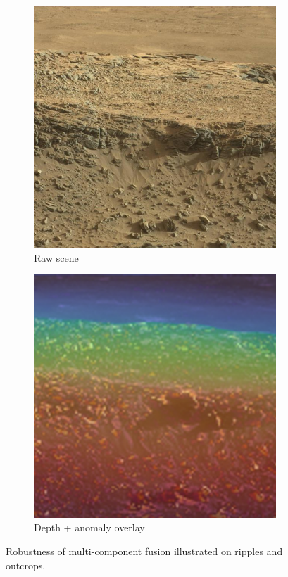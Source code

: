 \documentclass[12pt]{article}
\begin{document}
\begin{figure}[H]
  \centering
  \begin{subfigure}[t]{0.49\textwidth}
    \centering
    \includegraphics[width=\linewidth]{curiosity_ripples_and_outcrops_hard.jpg}
    \caption{Raw scene}
  \end{subfigure}\hfill
  \begin{subfigure}[t]{0.49\textwidth}
    \centering
    \includegraphics[width=\linewidth]{curiosity_ripples_and_outcrops_depth_anomaly.png}
    \caption{Depth + anomaly overlay}
  \end{subfigure}
  \caption{Robustness of multi-component fusion illustrated on ripples and outcrops.}
  \label{fig:ripples-outcrops}
\end{figure}
\end{document}
